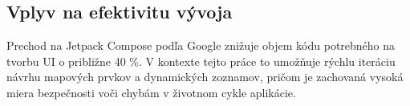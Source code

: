 \subsection{Vplyv na efektivitu vývoja}
Prechod na Jetpack Compose podľa Google znižuje objem kódu potrebného na tvorbu UI o približne 40 \%. V kontexte tejto práce to umožňuje rýchlu iteráciu návrhu mapových prvkov a dynamických zoznamov, pričom je zachovaná vysoká miera bezpečnosti voči chybám v životnom cykle aplikácie.



